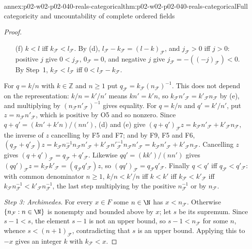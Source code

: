 \begin{annexitem}{annex:p02-w02-p02-040-reals-categorical}{thm:p02-w02-p02-040-reals-categorical}{Full categoricity and uncountability of complete ordered fields}
\begin{proof}
\begin{enumerate}
   If \(k,l\ge0\), this is (b).  If \(k=-a\) with \(a>0\) and \(l\ge0\), then
   \((kl)_{\mathcal F}=-((al)_{\mathcal F})=-(a_{\mathcal F}l_{\mathcal F})=(-a_{\mathcal F})l_{\mathcal F}
   =k_{\mathcal F}l_{\mathcal F}\); the case \(k\ge0>l\) is symmetric by F6.
   If \(k=-a\), \(l=-b\) with \(a,b>0\), then
   \((kl)_{\mathcal F}=(ab)_{\mathcal F}=a_{\mathcal F}b_{\mathcal F}=(-a_{\mathcal F})(-b_{\mathcal F})=k_{\mathcal F}l_{\mathcal F}\).
 \item[(f)] \(k<l\) iff \(k_{\mathcal F}<l_{\mathcal F}\).  By (d),
   \(l_{\mathcal F}-k_{\mathcal F}=(l-k)_{\mathcal F}\), and
   \(j_{\mathcal F}>0\) iff \(j>0\): positive \(j\) give \(0<j_{\mathcal F}\),
   \(0_{\mathcal F}=0\), and negative \(j\) give \(j_{\mathcal F}=-((-j)_{\mathcal F})<0\).
   By Step~1, \(k_{\mathcal F}<l_{\mathcal F}\) iff \(0<l_{\mathcal F}-k_{\mathcal F}\).
\end{enumerate}
For \(q=k/n\) with \(k\in\mathbb Z\) and
\(n\geq1\) put \(q_{\mathcal F}=k_{\mathcal F}(n_{\mathcal F})^{-1}\).  This
does not depend on the representation: \(k/n=k'/n'\) means \(kn'=k'n\), so
\(k_{\mathcal F}n'_{\mathcal F}=k'_{\mathcal F}n_{\mathcal F}\) by (e), and
multiplying by \((n_{\mathcal F}n'_{\mathcal F})^{-1}\) gives equality.  For
\(q=k/n\) and \(q'=k'/n'\), put \(z=n_{\mathcal F}n'_{\mathcal F}\), which is
positive by O5 and so nonzero.  Since \(q+q'=(kn'+k'n)/(nn')\), (d) and (e) give
\((q+q')_{\mathcal F}z=k_{\mathcal F}n'_{\mathcal F}+k'_{\mathcal F}n_{\mathcal F}\),
the inverse of \(z\) cancelling by F5 and F7; and by F9, F5 and F6,
\((q_{\mathcal F}+q'_{\mathcal F})z=k_{\mathcal F}n_{\mathcal F}^{-1}n_{\mathcal F}n'_{\mathcal F}
+k'_{\mathcal F}n'^{-1}_{\mathcal F}n_{\mathcal F}n'_{\mathcal F}=k_{\mathcal F}n'_{\mathcal F}+k'_{\mathcal F}n_{\mathcal F}\).
Cancelling \(z\) gives \((q+q')_{\mathcal F}=q_{\mathcal F}+q'_{\mathcal F}\).
Likewise \(qq'=(kk')/(nn')\) gives
\((qq')_{\mathcal F}z=k_{\mathcal F}k'_{\mathcal F}=(q_{\mathcal F}q'_{\mathcal F})z\),
so \((qq')_{\mathcal F}=q_{\mathcal F}q'_{\mathcal F}\).  Finally
\(q<q'\) iff \(q_{\mathcal F}<q'_{\mathcal F}\): with common denominator
\(n\geq1\), \(k/n<k'/n\) iff \(k<k'\) iff \(k_{\mathcal F}<k'_{\mathcal F}\) iff
\(k_{\mathcal F}n_{\mathcal F}^{-1}<k'_{\mathcal F}n_{\mathcal F}^{-1}\), the
last step multiplying by the positive \(n_{\mathcal F}^{-1}\) or by
\(n_{\mathcal F}\).

\emph{Step 3: Archimedes.}  For every \(x\in F\) some \(n\in\N\) has
\(x<n_{\mathcal F}\).  Otherwise \(\{n_{\mathcal F}:n\in\N\}\) is nonempty and
bounded above by \(x\); let \(s\) be its supremum.  Since \(s-1<s\), the
element \(s-1\) is not an upper bound, so \(s-1<n_{\mathcal F}\) for some
\(n\), whence \(s<(n+1)_{\mathcal F}\), contradicting that \(s\) is an upper
bound.  Applying this to \(-x\) gives an integer \(k\) with
\(k_{\mathcal F}<x\).


\end{proof}
\end{annexitem}
